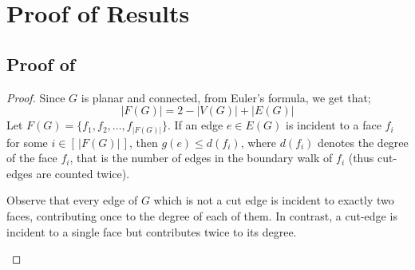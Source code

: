 \documentclass[pdflatex,sn-basic,Numbered]{sn-jnl}
\begin{document}
\section{Proof of Results}
\subsection{Proof of }
\begin{proof}
Since $G$ is planar and connected, from Euler's formula, we get that; 
\begin{equation}\label{euler}
    |F(G)| = 2 - |V(G)| + |E(G)|
\end{equation}
Let $F(G) = \{ f_1, f_2, \dots , f_{|F(G)|}\}$. If an edge $e \in E(G)$ is incident to a face $f_i$ for some $i \in [\,|F(G)|\,]$, then $g(e) \leq d(f_i)$, where $d(f_i)$ denotes the degree of the face $f_i$, that is the number of edges in the boundary walk of $f_i$ (thus cut-edges are counted twice). 

Observe that every edge of $G$ which is not a cut edge is incident to exactly two faces, contributing once to the degree of each of them. In contrast, a cut-edge is incident to a single face but contributes twice to its degree.

\begin{figure}[htb]
    \centering %
\end{figure}
\end{proof}
\end{document}
